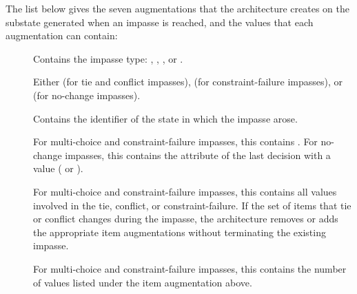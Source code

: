 The list
below gives the seven augmentations that the architecture creates on the
substate generated when an impasse is reached, and the
values that each augmentation can contain:\vspace{-12pt}
\begin{description} 
\item [] \vspace{-8pt} 

\item [] Contains the impasse type: , 
    , , or .\vspace{-
8pt} 

\item []Either  (for tie and conflict
        impasses),  (for constraint-failure
        impasses), or  (for no-change impasses).\vspace{-8pt} 

\item [] Contains the identifier of the state in which 
        the impasse arose.\vspace{-8pt}

\item [] For multi-choice and constraint-failure 
impasses,
        this contains . For
        no-change impasses, this contains the attribute of the last 
        decision with a value ( or ).\vspace{-8pt}

\item [] For multi-choice and constraint-failure impasses, 
this 
        contains all values involved in the tie, conflict, or
        constraint-failure. If the set of items that tie or conflict changes
        during the impasse, the architecture removes or adds the appropriate
        item augmentations without terminating the existing impasse.\vspace{-
8pt}

\item [] For multi-choice and constraint-failure impasses, 
this 
        contains the number of values listed under the item augmentation above.\vspace{-8pt}


\end{description}
